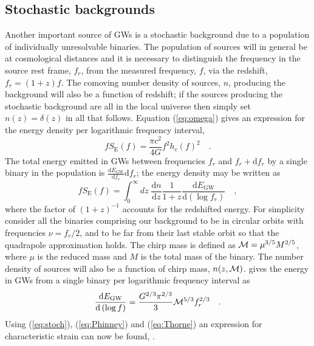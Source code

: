\subsection{Stochastic backgrounds}
Another important source of GWs is a stochastic background due to a population of individually unresolvable binaries. The population of sources will in general be at cosmological distances and it is necessary to distinguish the frequency in the source rest frame, $f_{r}$, from the measured frequency, $f$, via the redshift, $f_{r}=(1+z)f$. The comoving number density of sources, $n$, producing the background will also be a function of redshift; if the sources producing the stochastic background are all in the local universe then simply set $n(z)=\delta (z)$ in all that follows. Equation (\ref{eq:omega}) gives an expression for the energy density per logarithmic frequency interval,
\begin{equation}\label{eq:stoch} fS_{\textrm{E}}(f)=\frac{\pi c^{2}}{4G}f^{2}h_{c}(f)^{2} \quad . \end{equation}
The total energy emitted in GWs between frequencies $f_{r}$ and $f_{r}+\textrm{d}f_{r}$ by a single binary in the population is $\frac{\textrm{d}E_{\textrm{GW}}}{\textrm{d}f_{r}}\textrm{d}f_{r}$; the energy density may be written as
\begin{equation}\label{eq:Phinney} fS_{\textrm{E}}(f)=\int_{0}^{\infty}dz\; \frac{\textrm{d}n}{\textrm{d}z}\frac{1}{1+z}\frac{\textrm{d}E_{\textrm{GW}}}{\textrm{d}\left(\log f_{r} \right)} \quad , \end{equation}
where the factor of $\left( 1+z \right)^{-1}$ accounts for the redshifted energy.
For simplicity consider all the binaries comprising our background to be in circular orbits with frequencies $\nu=f_{r}/2$, and to be far from their last stable orbit so that the quadrapole approximation holds. The chirp mass is defined as ${\cal{M}}=\mu^{3/5}M^{2/5}$, where $\mu$ is the reduced mass and $M$ is the total mass of the binary. The number density of sources will also be a function of chirp mass, $n(z,{\cal{M}})$. \cite{Thorne} gives the energy in GWs from a single binary per logarithmic frequency interval as
\begin{equation}\label{eq:Thorne} \frac{\textrm{d}E_{\textrm{GW}}}{\textrm{d}\left(\log f \right)}=\frac{G^{2/3}\pi^{2/3}}{3}{\cal{M}}^{5/3}f_{r}^{2/3} \quad . \end{equation}
Using (\ref{eq:stoch}), (\ref{eq:Phinney}) and (\ref{eq:Thorne}) an expression for characteristic strain can now be found, \cite{SesanaVecchioColancino}.
